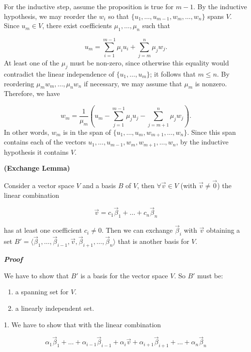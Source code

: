 For the inductive step, assume the proposition is true for $m - 1$. By the inductive hypothesis, we may reorder the $w_i$ so that $\{ u_1, \ldots, u_{m-1}, w_m, \ldots, w_n \}$ spans $V$. Since $u_m \in V$, there exist coefficients $\mu_1, \ldots, \mu_n$ such that

\[
u_m = \sum_{i=1}^{m-1} \mu_i u_i + \sum_{j=m}^{n} \mu_j w_j.
\]
At least one of the $\mu_j$ must be non-zero, since otherwise this equality would contradict the linear independence of $\{ u_1, \ldots, u_m \}$; it follows that $m \leq n$. By reordering $\mu_m w_m, \ldots, \mu_n w_n$ if necessary, we may assume that $\mu_m$ is nonzero. Therefore, we have

\[
w_m = \frac{1}{\mu_m} \left( u_m - \sum_{j=1}^{m-1} \mu_j u_j - \sum_{j=m+1}^{n} \mu_j w_j \right).
\]
In other words, $w_m$ is in the span of $\{ u_1, \ldots, u_m, w_{m+1}, \ldots, w_n \}$. Since this span contains each of the vectors $u_1, \ldots, u_{m-1}, w_m, w_{m+1}, \ldots, w_n$, by the inductive hypothesis it contains $V$.

\begin{lemma}
{\normalfont\textbf{(Exchange Lemma)}}

Consider a vector space $V$ and a basis $B$ of $V$, then $\forall \vec v \in V$ (with $\vec v \neq \vec 0$)
the linear combination 

$$
\vec v = c_1 \vec \beta_1 + \dots + c_n \vec \beta_n
$$

has at least one coefficient $c_i \neq 0$. Then we can exchange $\vec \beta_i$ with $\vec v$ obtaining a set $B' = \langle \vec \beta_1, \dots, \vec \beta_{i-1}, \vec v, \vec \beta_{i+1}, \dots , \vec \beta_n\rangle$ that is another basis for $V$.
\label{lemma:exchange}
\end{lemma}


\textbf{\textit{Proof}}

We have to show that $B'$ is a basis for the vector space $V$. So $B'$ must be:

\begin{enumerate}
    \item a spanning set for $V$.
    \item a linearly independent set.
\end{enumerate}

1. We have to show that with the linear combination 

$$
\alpha_1 \vec \beta_1 + \dots + \alpha_{i-1} \vec \beta_{i-1} + \alpha_i \vec v + \alpha_{i+1} \vec \beta_{i+1} + \dots + \alpha_n \vec \beta_n
$$

